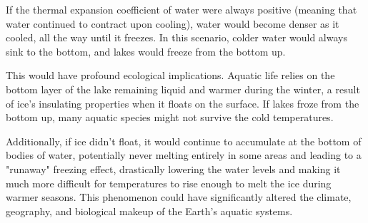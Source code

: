 \documentclass[12pt]{article}
\begin{document}
If the thermal expansion coefficient of water were always positive (meaning that water continued to contract upon cooling), water would become denser as it cooled, all the way until it freezes. In this scenario, colder water would always sink to the bottom, and lakes would freeze from the bottom up.

This would have profound ecological implications. Aquatic life relies on the bottom layer of the lake remaining liquid and warmer during the winter, a result of ice's insulating properties when it floats on the surface. If lakes froze from the bottom up, many aquatic species might not survive the cold temperatures.

Additionally, if ice didn't float, it would continue to accumulate at the bottom of bodies of water, potentially never melting entirely in some areas and leading to a "runaway" freezing effect, drastically lowering the water levels and making it much more difficult for temperatures to rise enough to melt the ice during warmer seasons. This phenomenon could have significantly altered the climate, geography, and biological makeup of the Earth's aquatic systems.
\end{document}
